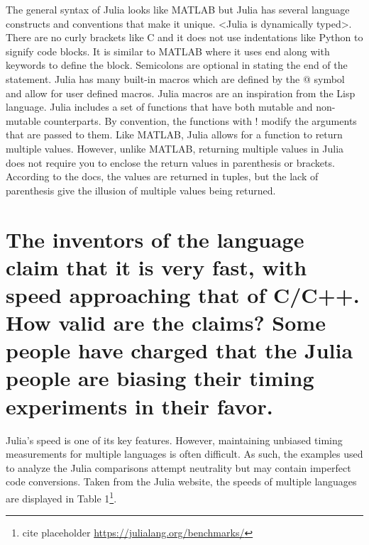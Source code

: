\documentclass[10pt]{article}
\begin{document}
	The general syntax of Julia looks like MATLAB but Julia has several language constructs and conventions that make it unique. <Julia is dynamically typed>. There are no curly brackets like C and it does not use indentations like Python to signify code blocks. It is similar to MATLAB where it uses end along with keywords to define the block. Semicolons are optional in stating the end of the statement. Julia has many built-in macros which are defined by the @ symbol and allow for user defined macros. Julia macros are an inspiration from the Lisp language. Julia includes a set of functions that have both mutable and non-mutable counterparts. By convention, the functions with ! modify the arguments that are passed to them. Like MATLAB, Julia allows for a function to return multiple values. However, unlike MATLAB, returning multiple values in Julia does not require you to enclose the return values in parenthesis or brackets. According to the docs, the values are returned in tuples, but the lack of parenthesis give the illusion of multiple values being returned.

\section*{\normalsize The inventors of the language claim that it is very fast, with speed approaching that of C/C++. How valid are the claims? Some people have charged that the Julia people are biasing their timing experiments in their favor.}

Julia's speed is one of its key features. However, maintaining unbiased timing measurements for multiple languages is often difficult. As such, the examples used to analyze the Julia comparisons attempt neutrality but may contain imperfect code conversions. Taken from the Julia website, the speeds of multiple languages are displayed in Table 1\footnote{cite placeholder \url{https://julialang.org/benchmarks/}}.
\end{document}

